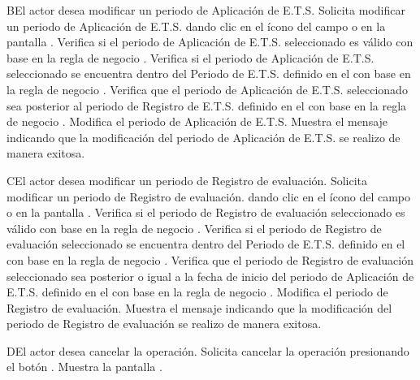 \begin{UCtrayectoriaA}{B}{El actor desea modificar un periodo de Aplicación de E.T.S.}
	\UCpaso[\UCactor]  \label{IN-DAE-CU4.2:seleccionarAplicacion} Solicita modificar un periodo de Aplicación de E.T.S. dando clic en el ícono {\IUCalendario} del campo  o  en la pantalla .
	\UCpaso Verifica si el periodo de Aplicación de E.T.S. seleccionado es válido con base en la regla de negocio . 
	\UCpaso Verifica si el periodo de Aplicación de E.T.S. seleccionado se encuentra dentro del
	Periodo de E.T.S. definido en el  con base en la regla de negocio . 
	\UCpaso Verifica que el periodo de Aplicación de E.T.S. seleccionado sea posterior al periodo de Registro de E.T.S. definido en el  con base en la regla de negocio . 
	\UCpaso Modifica el periodo de Aplicación de E.T.S.
	\UCpaso Muestra el mensaje  indicando que la modificación del periodo de Aplicación de E.T.S. se realizo de manera exitosa.
\end{UCtrayectoriaA}

\begin{UCtrayectoriaA}{C}{El actor desea modificar un periodo de Registro de evaluación.}
	\UCpaso[\UCactor]  \label{IN-DAE-CU4.2:seleccionarEvaluacion} Solicita modificar un periodo de Registro de evaluación. dando clic en el ícono {\IUCalendario} del campo  o  en la pantalla .
	\UCpaso Verifica si el periodo de Registro de evaluación seleccionado es válido con base en la regla de negocio . 
	\UCpaso Verifica si el periodo de Registro de evaluación seleccionado se encuentra dentro del
	Periodo de E.T.S. definido en el  con base en la regla de negocio . 
	\UCpaso Verifica que el periodo de Registro de evaluación seleccionado sea posterior o igual a la fecha de inicio del periodo de Aplicación de E.T.S. definido en el  con base en la regla de negocio . 
	\UCpaso Modifica el periodo de Registro de evaluación.
	\UCpaso Muestra el mensaje  indicando que la modificación del periodo de Registro de evaluación se realizo de manera exitosa.
\end{UCtrayectoriaA}

\begin{UCtrayectoriaA}{D}{El actor desea cancelar la operación.}
	\UCpaso[\UCactor] Solicita cancelar la operación presionando el botón .
	\UCpaso Muestra la pantalla .
\end{UCtrayectoriaA}